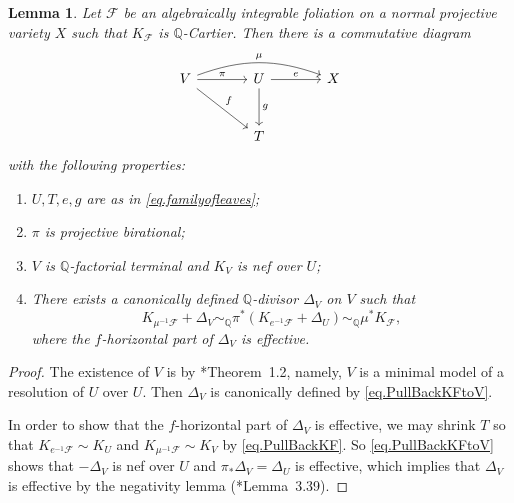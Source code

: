 \documentclass[12pt,twoside]{amsart}
\newtheorem{lem}[thm]{Lemma}
\theoremstyle{definition}
\begin{document}
\begin{lem}\label{lem.termoffoliation}
    Let $\mathcal{F}$ be an algebraically integrable foliation on a normal projective variety $X$ such that $K_{\mathcal{F}}$ is $\mathbb{Q}$-Cartier. Then there is a commutative diagram
    \begin{equation}\label{eq.termoffolation}
        \begin{tikzcd}[row sep=large, column sep=large]
		V \arrow[rr,"\mu", bend left=20]\arrow[r,"\pi"] \arrow[dr,"f"] & U \arrow[r,"e"] \arrow[d,"g"] & X \\
		  & T
	\end{tikzcd}
    \end{equation} 
    with the following properties:
    \begin{enumerate}
        \item $U, T, e, g$ are as in \eqref{eq.familyofleaves};
        \item $\pi$ is projective birational;
        \item $V$ is $\mathbb{Q}$-factorial terminal and $K_V$ is nef over $U$;
        \item There exists a canonically defined $\mathbb{Q}$-divisor $\Delta_V$ on $V$ such that 
            \begin{equation}\label{eq.PullBackKFtoV}
	       K_{\mu^{-1}\mathcal{F}} + \Delta_V \sim_{\mathbb{Q}} \pi^*(K_{e^{-1}\mathcal{F}} + \Delta_U )\sim_{\mathbb{Q}}\mu^*K_{\mathcal{F}},
            \end{equation} 
            where the $f$-horizontal part of $\Delta_V$ is effective. 
    \end{enumerate}
\end{lem}

\begin{proof}
    The existence of $V$ is by \cite{BCHM}*{Theorem~1.2}, namely, $V$ is a minimal model of a resolution of $U$ over $U$. Then $\Delta_V$ is canonically defined by \eqref{eq.PullBackKFtoV}. 

    In order to show that the $f$-horizontal part of $\Delta_V$ is effective, we may shrink $T$ so that $K_{e^{-1}\mathcal{F}}\sim K_U$ and $K_{\mu^{-1}\mathcal{F}}\sim K_V$ by \eqref{eq.PullBackKF}. So \eqref{eq.PullBackKFtoV} shows that $-\Delta_V$ is nef over $U$ and $\pi_*\Delta_V=\Delta_U$ is effective, which implies that $\Delta_V$ is effective by the negativity lemma (\cite{kollar-mori}*{Lemma~3.39}). 
\end{proof}
\end{document}

